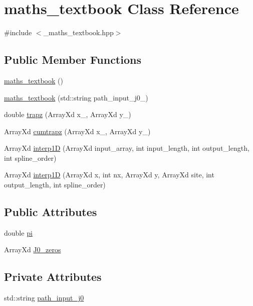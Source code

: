\hypertarget{classmaths__textbook}{}\section{maths\+\_\+textbook Class Reference}
\label{classmaths__textbook}


{\ttfamily \#include $<$\+\_\+maths\+\_\+textbook.\+hpp$>$}

\subsection*{Public Member Functions}
\begin{DoxyCompactItemize}
\item 
\hyperlink{classmaths__textbook_a7be915ec6de7f305b96325ff5d821607}{maths\+\_\+textbook} ()
\item 
\hyperlink{classmaths__textbook_acca32bf0f3860cbb8e76687435f0fa24}{maths\+\_\+textbook} (std\+::string path\+\_\+input\+\_\+j0\+\_\+)
\item 
double \hyperlink{classmaths__textbook_a158ce9c89ee1db5495810c25ee2aed57}{trapz} (Array\+Xd x\+\_\+, Array\+Xd y\+\_\+)
\item 
Array\+Xd \hyperlink{classmaths__textbook_ae893700d202ab9a84e33974f9ca42da3}{cumtrapz} (Array\+Xd x\+\_\+, Array\+Xd y\+\_\+)
\item 
Array\+Xd \hyperlink{classmaths__textbook_a803caea252953788b96a898a3bab9bd0}{interp1D} (Array\+Xd input\+\_\+array, int input\+\_\+length, int output\+\_\+length, int spline\+\_\+order)
\item 
Array\+Xd \hyperlink{classmaths__textbook_ac4789e1e67a597303faab6cc5fa889ec}{interp1D} (Array\+Xd x, int nx, Array\+Xd y, Array\+Xd site, int output\+\_\+length, int spline\+\_\+order)
\end{DoxyCompactItemize}
\subsection*{Public Attributes}
\begin{DoxyCompactItemize}
\item 
double \hyperlink{classmaths__textbook_a96b811ef2a81ca51b98cf2a10c8ac5bc}{pi}
\item 
Array\+Xd \hyperlink{classmaths__textbook_a41398eada5e3eb88fb64d044c14aed26}{J0\+\_\+zeros}
\end{DoxyCompactItemize}
\subsection*{Private Attributes}
\begin{DoxyCompactItemize}
\item 
std\+::string \hyperlink{classmaths__textbook_a5c8a254bd117beaba43916c38f8f6a66}{path\+\_\+input\+\_\+j0}
\end{DoxyCompactItemize}


